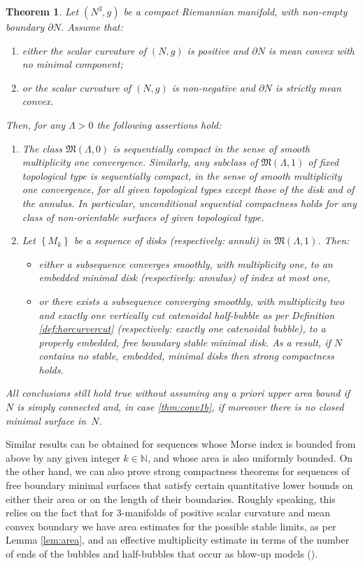\documentclass[10pt]{amsart}
\newenvironment{enumeratea}
{\bgroup\def\theenumi{\alph{enumi}}\begin{enumerate}}
{\end{enumerate}\egroup}
\newcounter{cas}
\newtheorem{thm}{Theorem}
\theoremstyle{definition}
\begin{document}
\begin{thm}\label{thm:conv1}
Let $(N^3,g)$ be a compact Riemannian manifold, with non-empty boundary $\partial N$. Assume that:
\begin{enumeratea}
\item\label{thm:conv1a}
\emph{either} the scalar curvature of $(N,g)$ is positive and $\partial N$ is mean convex with no minimal component;
\item\label{thm:conv1b}
\emph{or} the scalar curvature of $(N,g)$ is non-negative and $\partial N$ is strictly mean convex.
\end{enumeratea}
Then, for any $\Lambda>0$ the following assertions hold:
\begin{enumerate}
\item
The class $\mathfrak{M}(\Lambda,0)$ is sequentially compact in the sense of smooth multiplicity one convergence. Similarly, any subclass of $\mathfrak{M}(\Lambda, 1)$ of fixed topological type is sequen\-tially compact, in the sense of smooth multiplicity one convergence, for all given topological types except those of the disk and of the annulus. In particular, unconditional sequential compactness holds for any class of non-orientable surfaces of given topological type.

\item
Let $\left\{M_k\right\}$ be a sequence of disks (respectively: annuli) in $\mathfrak{M}(\Lambda, 1)$. Then:
\begin{itemize}
\item
\emph{either} a subsequence converges smoothly, with multiplicity one, to an embedded minimal disk (respectively: annulus) of index at most one,

\item
\emph{or} there exists a subsequence converging smoothly, with multiplicity two and exactly one vertically cut catenoidal half-bubble as per Definition \ref{def:horcurvercut} (respec\-tively: exactly one catenoidal bubble), to a properly embedded, free boundary stable minimal disk. As a result, if $N$ contains no stable, embedded, minimal disks then strong compactness holds.
\end{itemize}
\end{enumerate}
All conclusions still hold true without assuming any a priori upper area bound if~$N$ is simply connected and, in case \eqref{thm:conv1b}, if moreover there is no \emph{closed} minimal surface in~$N$.
\end{thm}

Similar results can be obtained for sequences whose Morse index is bounded from above by any given integer $k\in\mathbb{N}$, and whose area is also uniformly bounded. On the other hand, we can also prove strong compactness theorems for sequences of free boundary minimal surfaces that satisfy certain quantitative lower bounds on either their area or on the length of their boundaries. Roughly speaking, this relies on the fact that for 3-manifolds of positive scalar curvature and mean convex boundary we have area estimates for the possible stable limits, as per Lemma \ref{lem:area}, and an effective multiplicity estimate in terms of the number of ends of the bubbles and half-bubbles that occur as blow-up models (\cf \cite[Prop.\,13]{ABCS18}).
\end{document}
